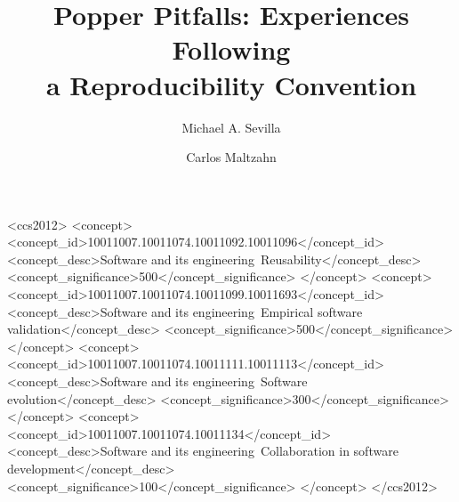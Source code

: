 \documentclass[sigconf]{acmart}
\begin{document}
\title{Popper Pitfalls: Experiences Following \\a Reproducibility Convention}

\author{Michael A. Sevilla}

\author{Carlos Maltzahn}



%
%
\begin{CCSXML}
<ccs2012>
<concept>
<concept_id>10011007.10011074.10011092.10011096</concept_id>
<concept_desc>Software and its engineering~Reusability</concept_desc>
<concept_significance>500</concept_significance>
</concept>
<concept>
<concept_id>10011007.10011074.10011099.10011693</concept_id>
<concept_desc>Software and its engineering~Empirical software validation</concept_desc>
<concept_significance>500</concept_significance>
</concept>
<concept>
<concept_id>10011007.10011074.10011111.10011113</concept_id>
<concept_desc>Software and its engineering~Software evolution</concept_desc>
<concept_significance>300</concept_significance>
</concept>
<concept>
<concept_id>10011007.10011074.10011134</concept_id>
<concept_desc>Software and its engineering~Collaboration in software development</concept_desc>
<concept_significance>100</concept_significance>
</concept>
</ccs2012>
\end{CCSXML}



\maketitle









\end{document}
